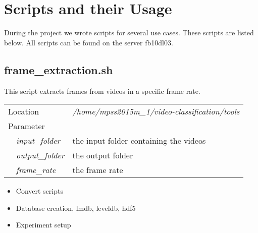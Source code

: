 \section{Scripts and their Usage}
\label{sec:scripts}

During the project we wrote scripts for several use cases.
These scripts are listed below.
All scripts can be found on the server fb10dl03.

\subsection{frame\_extraction.sh}
This script extracts frames from videos in a specific frame rate.

\begin{table}[ht]
\begin{tabular}{lll}
\multicolumn{2}{l}{Location}  & \textit{/home/mpss2015m\_1/video-classification/tools} \\
\multicolumn{2}{l}{Parameter} &                                        \\
        & \textit{input\_folder}       & the input folder containing the videos \\
        & \textit{output\_folder}      & the output folder                      \\
        & \textit{frame\_rate}         & the frame rate
\end{tabular}
\end{table}



\begin{itemize}
	\item Convert scripts
	\item Database creation, lmdb, leveldb, hdf5
	\item Experiment setup
\end{itemize}